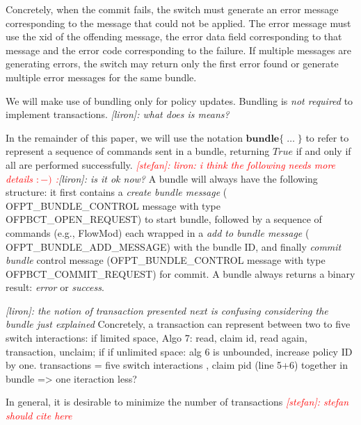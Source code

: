 \documentclass[conference]{sigcomm-alternate}
\newcommand{\stefan}[1]{\textit{\textcolor{red}{[stefan]: #1}}} %
\newcommand{\liron}[1]{\textit{\textcolor{mygreen}{[liron]: #1}}} %
\begin{document}
Concretely, when the commit fails, the switch must generate an error message corresponding to the
message that could not be applied. The error message must use the xid of the offending message,
the error data field corresponding to that message and the error code corresponding to the failure. If
multiple messages are generating errors, the switch may return only the first error found or generate
multiple error messages for the same bundle.


We will make use of bundling only for policy updates. 
Bundling is \emph{not required} to implement transactions.
\liron{what does is means?}

In the remainder of this paper, we will use the notation 
$\textbf{bundle}\{\;\ldots\;\}$ to refer to represent a
sequence of commands sent in a bundle, returning $True$ if and only if all are performed successfully.
\stefan{liron: i think the following needs more details $:-)$ :}\liron{is it ok now?} A bundle will always have the following structure:
it first contains a \emph{create bundle message} ( \textsf{OFPT\_BUNDLE\_CONTROL} message with type
\textsf{OFPBCT\_OPEN\_REQUEST}) to start bundle,
followed by a sequence of commands (e.g., FlowMod) each wrapped in a \emph{add to bundle message} ( \textsf{OFPT\_BUNDLE\_ADD\_MESSAGE}) with the bundle ID, 
and finally \emph{commit bundle} control message (\textsf{OFPT\_BUNDLE\_CONTROL} message with type \textsf{OFPBCT\_COMMIT\_REQUEST}) for commit.
A bundle always returns a binary result: \emph{error} or \emph{success}.

\liron{the notion of transaction presented next is confusing considering the bundle just explained}
Concretely, a transaction can represent between two to five switch interactions:
if limited space, Algo 7: read, claim id, read again, transaction, unclaim;
if if unlimited space: alg 6 is unbounded, increase policy ID by one.
transactions = five switch interactions , claim pid (line 5+6) together in bundle => one iteraction less?

In general, it is desirable to minimize the number of transactions \stefan{stefan should cite \cite{Jin2014Dionysus} here}
\end{document}
